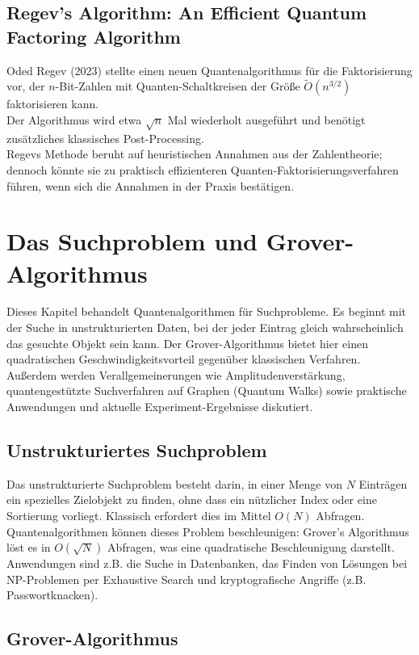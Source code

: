 \subsection{Regev’s Algorithm: An Efficient Quantum Factoring Algorithm}

Oded Regev (2023) stellte einen neuen Quantenalgorithmus für die Faktorisierung vor, der $n$-Bit-Zahlen mit Quanten-Schaltkreisen der Größe $\tilde O(n^{3/2})$ faktorisieren kann.\\
Der Algorithmus wird etwa $\sqrt{n}$ Mal wiederholt ausgeführt und benötigt zusätzliches klassisches Post-Processing.\\
Regevs Methode beruht auf heuristischen Annahmen aus der Zahlentheorie; dennoch könnte sie zu praktisch effizienteren Quanten-Faktorisierungsverfahren führen, wenn sich die Annahmen in der Praxis bestätigen.

\section{Das Suchproblem und Grover-Algorithmus}
Dieses Kapitel behandelt Quantenalgorithmen für Suchprobleme. Es beginnt mit der Suche in unstrukturierten Daten, bei der jeder Eintrag gleich wahrscheinlich das gesuchte Objekt sein kann. Der Grover-Algorithmus bietet hier einen quadratischen Geschwindigkeitsvorteil gegenüber klassischen Verfahren. Außerdem werden Verallgemeinerungen wie Amplitudenverstärkung, quantengestützte Suchverfahren auf Graphen (Quantum Walks) sowie praktische Anwendungen und aktuelle Experiment-Ergebnisse diskutiert.

\subsection{Unstrukturiertes Suchproblem}

Das unstrukturierte Suchproblem besteht darin, in einer Menge von $N$ Einträgen ein spezielles Zielobjekt zu finden, ohne dass ein nützlicher Index oder eine Sortierung vorliegt. Klassisch erfordert dies im Mittel $O(N)$ Abfragen.\\
Quantenalgorithmen können dieses Problem beschleunigen: Grover’s Algorithmus löst es in $O(\sqrt{N})$ Abfragen, was eine quadratische Beschleunigung darstellt.\\
Anwendungen sind z.B. die Suche in Datenbanken, das Finden von Lösungen bei NP-Problemen per Exhaustive Search und kryptografische Angriffe (z.B. Passwortknacken).

\subsection{Grover-Algorithmus}

